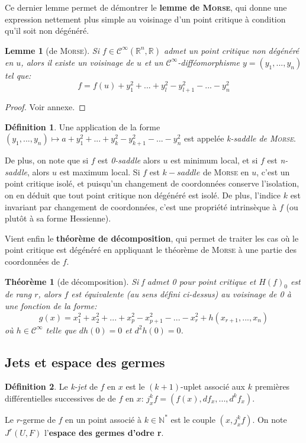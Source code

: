 \documentclass{article}
\newcommand{\cinf}{\mathcal{C}^\infty}
\newcommand{\R}{\mathbb{R}}
\newcommand{\N}{\mathbb{N}}
\newtheorem{thm}{Théorème}
\newtheorem{lemm}{Lemme}
\theoremstyle{definition}
\newtheorem{defn}{Définition}
\begin{document}
Ce dernier lemme permet de démontrer le \textbf{lemme de \textsc{Morse}}, qui donne une expression nettement plus simple au voisinage d'un point critique à condition qu'il soit non dégénéré.
\begin{lemm}[de \textsc{Morse}]
	Si $f\in\cinf(\R^n,\R)$ admet un point critique non dégénéré en $u$, alors il existe un voisinage de $u$ et un $\cinf$-difféomorphisme $y=(y_1,...,y_n)$ tel que:
	$$f=f(u)+y_1^2+...+y_l^2-y_{l+1}^2-...-y_n^2$$
\end{lemm}
\begin{proof} Voir annexe. \end{proof}
\begin{defn}
	Une application de la forme $(y_1,...,y_n)\mapsto a+y_1^2+...+y_k^2-y_{k+1}^2-...-y_n^2$ est appelée \textit{k-saddle de \textsc{Morse}}.
\end{defn}

De plus, on note que si $f$ est \textit{0-saddle} alors $u$ est minimum local, et si $f$ est \textit{n-saddle}, alors $u$ est maximum local.
Si $f$ est $k-saddle$ de \textsc{Morse} en $u$, c'est un point critique isolé, et puisqu'un changement de coordonnées conserve l'isolation, on en déduit que tout point critique non dégénéré est isolé.
De plus, l'indice $k$ est invariant par changement de coordonnées, c'est une propriété intrinsèque à $f$ (ou plutôt à sa forme Hessienne).

Vient enfin le \textbf{théorème de décomposition}, qui permet de traiter les cas où le point critique est dégénéré en appliquant le théorème de \textsc{Morse} à une partie des coordonnées de $f$.
\begin{thm}[de décomposition]
	Si f admet 0 pour point critique et $H(f)_0$ est de rang $r$, alors $f$ est équivalente (au sens défini ci-dessus) au voisinage de 0 à une fonction de la forme:
	$$g(x)= x_1^2+x_2^2+ ...+x_p^2-x_{p+1}^2 -...- x_r^2 + h(x_{r+1},...,x_n)$$
	où $h\in\cinf$ telle que $dh(0)=0$ et $d^2h(0)=0$.
\end{thm}

\subsection{Jets et espace des germes}
\begin{defn}
	Le \textit{k-jet} de $f$ en $x$ est le $(k+1)$-uplet associé aux $k$ premières différentielles successives de de $f$ en $x$: $j^k_x f = \left(f(x), df_x, ..., d^kf_x\right)$.

	Le $r$-germe de $f$ en un point associé à $k\in\N^*$ est le couple $(x,j^k_x f)$. On note $J^r(U,F)$ l'\textbf{espace des germes d'odre r}.
\end{defn}
\end{document}
